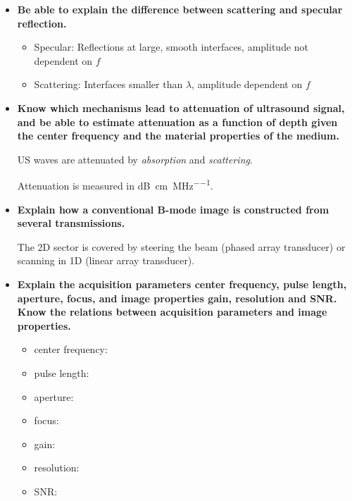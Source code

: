 \documentclass[10pt,a4paper,noendnumber=true]{scrartcl}
\begin{document}
\begin{itemize}
The differences in acoustic impedances ($Z_{1,2}=\rho \cdot c$ (in \si{\kg\per\m\squared\per\s})) between two media 1 and 2 determine how much energy is transmitted/reflected.

The relative reflected energy is given by
\begin{equation}
\alpha_R = \left(\frac{Z_2-Z_1}{Z_2+Z_1}\right)^2.
\end{equation}
The transmitted portion is then $\alpha_T=1-\alpha_R$.

Gel is used to bridge the air gap between the transducer and the human skin (Impedance matching).

\item \textbf{Be able to explain the difference between scattering and specular reflection.}

\begin{itemize}
\item Specular: Reflections at large, smooth interfaces, amplitude not dependent on $f$
\item Scattering: Interfaces smaller than $\lambda$, amplitude dependent on $f$
\end{itemize}

\item \textbf{Know which mechanisms lead to attenuation of ultrasound signal, and be able to estimate attenuation as a function of depth given the center frequency and the material properties of the medium.}

US waves are attenuated by \textit{absorption} and \textit{scattering}.

Attenuation is measured in \si{\dB\per\centi\meter\per\MHz}.

\item \textbf{Explain how a conventional B-mode image is constructed from several transmissions.}

The 2D sector is covered by steering the beam (phased array transducer) or scanning in 1D (linear array transducer).

\item \textbf{Explain the acquisition parameters center frequency, pulse length, aperture, focus, and image properties gain, resolution and SNR. Know the relations between acquisition parameters and image properties.}

\begin{itemize}
\item center frequency:
\item pulse length:
\item aperture:
\item focus:
\item gain:
\item resolution:
\item SNR:
\end{itemize}


\end{itemize}
\end{document}
